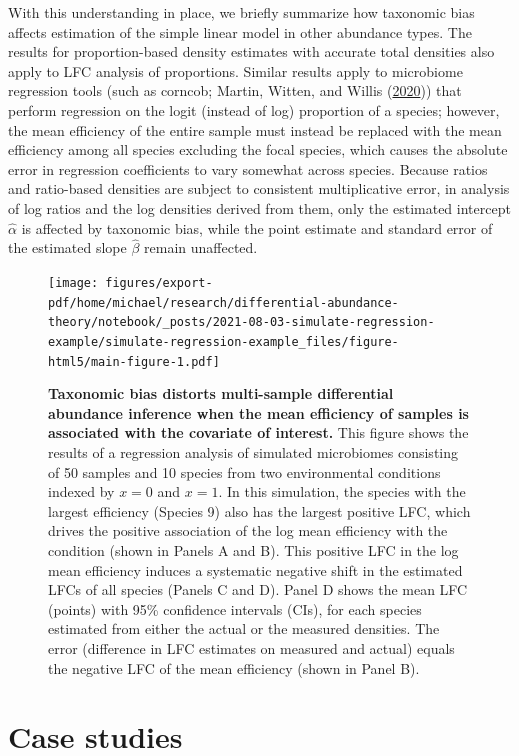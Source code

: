 \documentclass[
]{article}
\begin{document}
With this understanding in place, we briefly summarize how taxonomic bias affects estimation of the simple linear model in other abundance types.
The results for proportion-based density estimates with accurate total densities also apply to LFC analysis of proportions.
Similar results apply to microbiome regression tools (such as corncob; Martin, Witten, and Willis (\protect\hyperlink{ref-martin2020mode}{2020})) that perform regression on the logit (instead of log) proportion of a species; however,
the mean efficiency of the entire sample must instead be replaced with the mean efficiency among all species excluding the focal species, which causes the absolute error in regression coefficients to vary somewhat across species.
Because ratios and ratio-based densities are subject to consistent multiplicative error, in analysis of log ratios and the log densities derived from them, only the estimated intercept \(\hat \alpha\) is affected by taxonomic bias, while the point estimate and standard error of the estimated slope \(\hat \beta\) remain unaffected.

\begin{figure}
\centering
\texttt{[image: figures/export-pdf/home/michael/research/differential-abundance-theory/notebook/\_posts/2021-08-03-simulate-regression-example/simulate-regression-example\_files/figure-html5/main-figure-1.pdf]}
\caption{\label{fig:regression-example}\textbf{Taxonomic bias distorts multi-sample differential abundance inference when the mean efficiency of samples is associated with the covariate of interest.} This figure shows the results of a regression analysis of simulated microbiomes consisting of 50 samples and 10 species from two environmental conditions indexed by \(x=0\) and \(x=1\). In this simulation, the species with the largest efficiency (Species 9) also has the largest positive LFC, which drives the positive association of the log mean efficiency with the condition (shown in Panels A and B). This positive LFC in the log mean efficiency induces a systematic negative shift in the estimated LFCs of all species (Panels C and D). Panel D shows the mean LFC (points) with 95\% confidence intervals (CIs), for each species estimated from either the actual or the measured densities. The error (difference in LFC estimates on measured and actual) equals the negative LFC of the mean efficiency (shown in Panel B).}
\end{figure}



\hypertarget{case-studies}{%
\section{Case studies ~}\label{case-studies}}
\end{document}
